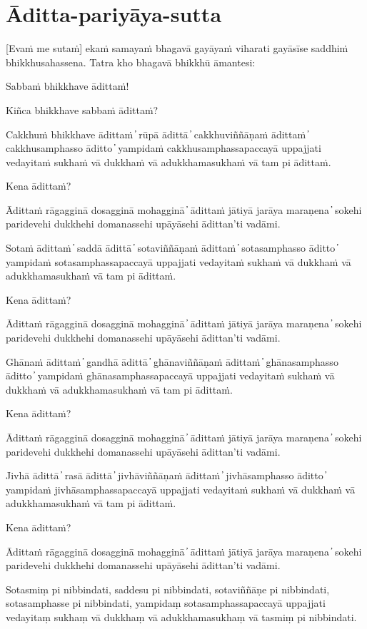\section{Āditta-pariyāya-sutta}

[Evaṁ me sutaṁ] ekaṁ samayaṁ bhagavā gayāyaṁ viharati gayāsīse saddhiṁ bhikkhusahassena. Tatra kho bhagavā bhikkhū āmantesi:

Sabbaṁ bhikkhave ādittaṁ!

Kiñca bhikkhave sabbaṁ ādittaṁ?

Cakkhuṁ bhikkhave ādittaṁ  ̓  rūpā ādittā  ̓  cakkhuviññāṇaṁ ādittaṁ  ̓  cakkhusamphasso āditto  ̓  yampidaṁ cakkhusamphassapaccayā uppajjati vedayitaṁ sukhaṁ vā dukkhaṁ vā adukkhamasukhaṁ vā tam pi ādittaṁ.

Kena ādittaṁ?

Ādittaṁ rāgagginā dosagginā mohagginā  ̓  ādittaṁ jātiyā jarāya maraṇena  ̓  sokehi paridevehi dukkhehi domanassehi upāyāsehi ādittan’ti vadāmi.

Sotaṁ ādittaṁ  ̓  saddā ādittā  ̓  sotaviññāṇaṁ ādittaṁ  ̓  sotasamphasso āditto  ̓  yampidaṁ sotasamphassapaccayā uppajjati vedayitaṁ sukhaṁ vā dukkhaṁ vā adukkhamasukhaṁ vā tam pi ādittaṁ.

Kena ādittaṁ?

Ādittaṁ rāgagginā dosagginā mohagginā  ̓  ādittaṁ jātiyā jarāya maraṇena  ̓  sokehi paridevehi dukkhehi domanassehi upāyāsehi ādittan’ti vadāmi.

Ghānaṁ ādittaṁ  ̓  gandhā ādittā  ̓  ghānaviññāṇaṁ ādittaṁ  ̓  ghānasamphasso āditto  ̓  yampidaṁ ghānasamphassapaccayā uppajjati vedayitaṁ sukhaṁ vā dukkhaṁ vā adukkhamasukhaṁ vā tam pi ādittaṁ.

Kena ādittaṁ?

Ādittaṁ rāgagginā dosagginā mohagginā  ̓  ādittaṁ jātiyā jarāya maraṇena  ̓  sokehi paridevehi dukkhehi domanassehi upāyāsehi ādittan’ti vadāmi.

Jivhā ādittā  ̓  rasā ādittā  ̓  jivhāviññāṇaṁ ādittaṁ  ̓  jivhāsamphasso āditto  ̓  yampidaṁ jivhāsamphassapaccayā uppajjati vedayitaṁ sukhaṁ vā dukkhaṁ vā adukkhamasukhaṁ vā tam pi ādittaṁ.

Kena ādittaṁ?

Ādittaṁ rāgagginā dosagginā mohagginā  ̓  ādittaṁ jātiyā jarāya maraṇena  ̓  sokehi paridevehi dukkhehi domanassehi upāyāsehi ādittan’ti vadāmi.

Sotasmiṃ pi nibbindati, saddesu pi nibbindati, sotaviññāṇe pi
nibbindati, sotasamphasse pi nibbindati, yampidaṃ sotasamphassapaccayā
uppajjati vedayitaṃ sukhaṃ vā dukkhaṃ vā adukkhamasukhaṃ vā tasmiṃ pi
nibbindati.

